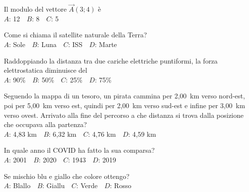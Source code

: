 \mcquestionfooter



\def\mcquestionnumber{4}


\mcquestionheader Il modulo del vettore $\vec{A}(3;4)$ è\\
{$A$}: 12\ \ {$B$}: 8\ \ {$C$}: 5\ \ 

\mcquestionfooter



\def\mcquestionnumber{5}


\mcquestionheader Come si chiama il satellite naturale della Terra?\\
{$A$}: Sole\ \ {$B$}: Luna\ \ {$C$}: ISS\ \ {$D$}: Marte\ \ 

\mcquestionfooter



\def\mcquestionnumber{6}


\mcquestionheader Raddoppiando la distanza tra due cariche elettriche puntiformi, la forza elettrostatica diminuisce del\\
{$A$}: 90\%\ \ {$B$}: 50\%\ \ {$C$}: 25\%\ \ {$D$}: 75\%\ \ 

\mcquestionfooter



\def\mcquestionnumber{7}


\mcquestionheader Seguendo la mappa di un tesoro, un pirata cammina per 2,00~km verso nord-est, poi per 5,00~km verso est, quindi per 2,00~km verso sud-est e infine per 3,00~km verso ovest. Arrivato alla fine del percorso a che distanza si trova dalla posizione che occupava alla partenza?\\
{$A$}: 4,83 km\ \ {$B$}: 6,32 km\ \ {$C$}: 4,76 km\ \ {$D$}: 4,59 km\ \ 

\mcquestionfooter



\def\mcquestionnumber{8}


\mcquestionheader In quale anno il COVID ha fatto la sua comparsa?\\
{$A$}: 2001\ \ {$B$}: 2020\ \ {$C$}: 1943\ \ {$D$}: 2019\ \ 

\mcquestionfooter



\def\mcquestionnumber{9}


\mcquestionheader Se mischio blu e giallo che colore ottengo?\\
{$A$}: Blallo\ \ {$B$}: Giallu\ \ {$C$}: Verde\ \ {$D$}: Rosso\ \ 

\mcquestionfooter



